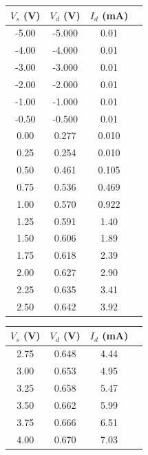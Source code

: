\documentclass{article}
\begin{document}
\begin{table}[btph]
  \centering
  \begin{subtable}[t]{0.5\textwidth}
    \begin{tabular}{cccc}
      $V_s$ (V) & $V_d$ (V) & $I_d$ (mA) \\
      \hline
      -5.00 & -5.000 & 0.01 \\
      -4.00 & -4.000 & 0.01 \\
      -3.00 & -3.000 & 0.01 \\
      -2.00 & -2.000 & 0.01 \\
      -1.00 & -1.000 & 0.01 \\
      -0.50 & -0.500 & 0.01 \\
      0.00 & 0.277 & 0.010 \\
      0.25 & 0.254 & 0.010 \\
      0.50 & 0.461 & 0.105 \\
      0.75 & 0.536 & 0.469 \\
      1.00 & 0.570 & 0.922 \\
      1.25 & 0.591 & 1.40 \\
      1.50 & 0.606 & 1.89 \\
      1.75 & 0.618 & 2.39 \\
      2.00 & 0.627 & 2.90 \\
      2.25 & 0.635 & 3.41 \\
      2.50 & 0.642 & 3.92 \\
    \end{tabular}
  \end{subtable}%
  \begin{subtable}[t]{0.5\textwidth}
    \begin{tabular}{cccc}
      $V_s$ (V) & $V_d$ (V) & $I_d$ (mA) \\
      \hline
      2.75 & 0.648 & 4.44 \\
      3.00 & 0.653 & 4.95 \\
      3.25 & 0.658 & 5.47 \\
      3.50 & 0.662 & 5.99 \\
      3.75 & 0.666 & 6.51 \\
      4.00 & 0.670 & 7.03 \\

\end{tabular}
\end{subtable}
\end{table}
\end{document}
